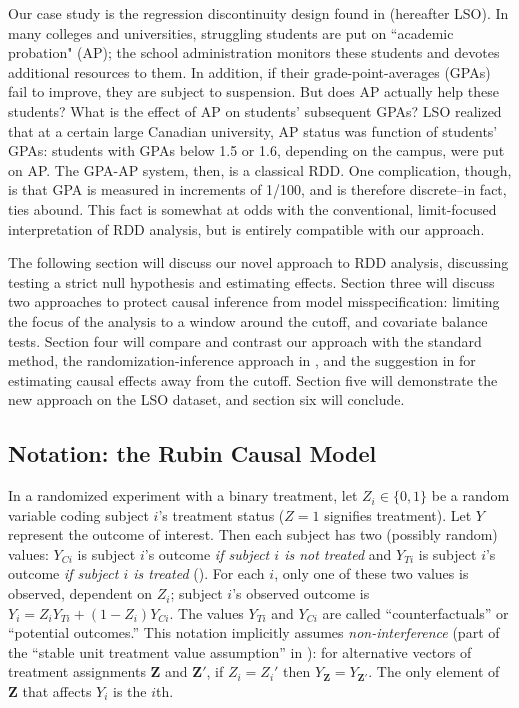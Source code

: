 \documentclass[12pt]{article}
\begin{document}
Our case study is the regression discontinuity design found in  \citet*{lindo2010ability} (hereafter LSO).
In many colleges and universities, struggling students are put on ``academic probation" (AP); the school administration monitors these students and devotes additional resources to them.
In addition, if their grade-point-averages (GPAs) fail to improve,
they are subject to suspension.
But does AP actually help these students?
What is the effect of AP on students' subsequent GPAs?
LSO realized that at a certain large Canadian university, AP status
was function of students' GPAs: students with GPAs below 1.5 or 1.6,
depending on the campus, were put on AP.
The GPA-AP system, then, is a classical RDD.
One complication, though, is that GPA is measured in increments of
1/100, and is therefore discrete--in fact, ties abound.
This fact is somewhat at odds with the conventional, limit-focused
interpretation of RDD analysis, but is entirely compatible with our
approach.

The following section will discuss our novel approach to RDD analysis,
discussing testing a strict null hypothesis and estimating effects.
Section three will discuss two approaches to protect causal inference
from model misspecification: limiting the focus of the analysis to a
window around the cutoff, and covariate balance tests.
Section four will compare and contrast our approach with the standard
method, the randomization-inference approach in \citet{rocio}, and the
suggestion in \citet{angrist2012wanna} for estimating causal effects
away from the cutoff.
Section five will demonstrate the new approach on the LSO dataset, and
section six will conclude.

\subsection{Notation: the Rubin Causal Model}
In a randomized experiment with a binary treatment, let $Z_i \in
\{0,1\}$ be a random variable coding subject $i$'s treatment status
($Z=1$ signifies treatment).
Let $Y$ represent the outcome of interest.
Then each subject has two (possibly random) values: $Y_{Ci}$ is
subject $i$'s outcome \emph{if subject $i$ is \emph{not} treated} and
$Y_{Ti}$ is subject $i$'s outcome \emph{if subject $i$ is treated}
(\cite{rubin1974estimating, splawa1990application}).
For each $i$, only one of these two values is observed, dependent on
$Z_i$;  subject $i$'s observed outcome is
$Y_i=Z_iY_{Ti}+(1-Z_i)Y_{Ci}$.
The values $Y_{Ti}$ and $Y_{Ci}$ are called ``counterfactuals'' or ``potential outcomes.''
This notation implicitly assumes \emph{non-interference}
\citep{cox:1958} (part of the ``stable unit treatment value
assumption'' in \citealt{rubin1978bayesian}):
for alternative vectors of treatment assignments $\bm{Z}$ and
$\bm{Z'}$, if $Z_i=Z_i'$ then $Y_{\bm{Z}}=Y_{\bm{Z'}}$.
The only element of $\bm{Z}$ that affects $Y_i$ is the $i$th.
\end{document}
